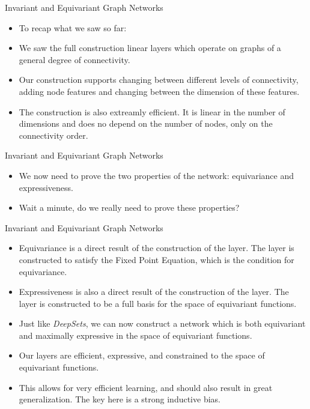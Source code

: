 \documentclass{beamer}
\begin{document}
\begin{frame}{Invariant and Equivariant Graph Networks}
    \begin{itemize}
        \setlength{\itemsep}{\fill}
        \item To recap what we saw so far:
        \item We saw the full construction linear layers which operate on graphs of a general degree of connectivity.
        \item Our construction supports changing between different levels of connectivity, adding node features and changing between the dimension of these features.
        \item The construction is also extreamly efficient. It is linear in the number of dimensions and does no depend on the number of nodes, only on the connectivity order.
    \end{itemize}
\end{frame}
\begin{frame}{Invariant and Equivariant Graph Networks}
    \begin{itemize}
        \setlength{\itemsep}{\fill}    
        \item We now need to prove the two properties of the network: equivariance and expressiveness.
        \item Wait a minute, do we really need to prove these properties?
        
    \end{itemize}
\end{frame}
\begin{frame}{Invariant and Equivariant Graph Networks}
    \begin{itemize}
        \setlength{\itemsep}{\fill}
        \item Equivariance is a direct result of the construction of the layer. The layer is constructed to satisfy the Fixed Point Equation, which is the condition for equivariance.
        \item Expressiveness is also a direct result of the construction of the layer. The layer is constructed to be a full basis for the space of equivariant functions.
        \item Just like \emph{DeepSets}, we can now construct a network which is both equivariant and maximally expressive in the space of equivariant functions.
        \item Our layers are efficient, expressive, and constrained to the space of equivariant functions.
        \item This allows for very efficient learning, and should also result in great generalization. The key here is a strong inductive bias.
    \end{itemize}
\end{frame}
\end{document}
